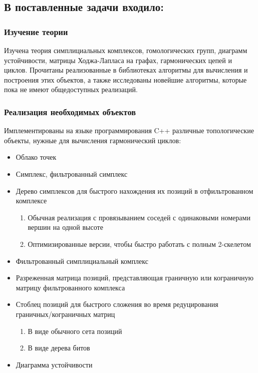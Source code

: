 \documentclass{article}
\begin{document}
\subsection*{В поставленные задачи входило:}
\subsubsection*{Изучение теории}
Изучена теория симплициальных комплексов, гомологических групп, диаграмм устойчивости, матрицы Ходжа-Лапласа на графах, гармонических цепей и циклов. Прочитаны реализованные в библиотеках алгоритмы для вычисления и построения этих объектов, а также исследованы новейшие алгоритмы, которые пока не имеют общедоступных реализаций.
\subsubsection*{Реализация необходимых объектов}
Имплементированы на языке программирования C++ различные топологические объекты, нужные для вычисления гармонический циклов:
\begin{itemize}
  \item Облако точек
  \item Симплекс, фильтрованный симплекс
  \item Дерево симплексов для быстрого нахождения их позиций в отфильтрованном комплексе \autocite{simplextree}
    \begin{enumerate}
      \item Обычная реализация с провязыванием соседей с одинаковыми номерами вершин на одной высоте
      \item Оптимизированные версии, чтобы быстро работать с полным 2-скелетом
    \end{enumerate}
  \item Фильтрованный симплициальный комплекс
  \item Разреженная матрица позиций, представляющая граничную или кограничную матрицу фильтрованного комплекса
  \item Стоблец позиций для быстрого сложения во время редуцирования граничных/кограничных матриц
    \begin{enumerate}
      \item В виде обычного сета позиций
      \item В виде дерева битов \autocite{bittreecolumn}
    \end{enumerate}
  \item Диаграмма устойчивости
\end{itemize}
\end{document}
